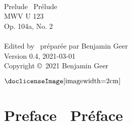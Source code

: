 \documentclass[a4paper, 12pt]{book}
\newcommand{\bigdot}[0]{{\Large \textbullet}}
\begin{document}
\frontmatter


\begin{titlepage}
\begin{center}
   \\
  \vspace{2cm}
  {\fontsize{32}{42}\selectfont Prelude \textbullet\ Prélude} \\
  \vspace{2 cm}
  {\fontsize{24}{34}\selectfont MWV U 123} \\
  \vspace{0.5 cm}
  {\fontsize{24}{34}\selectfont Op. 104a, No. 2} \\
  \vspace{4.6 cm}
  {\Large {}} \\
  \vspace{0.5 cm}
  {\Large Edited by \textbullet\ préparée par Benjamin Geer} \\
  \vspace{4.6 cm}
  {\footnotesize Version 0.4, 2021-03-01} \\
  \vspace{0.1 cm}
  {\footnotesize Copyright \copyright\ 2021 Benjamin Geer} \\
  \vspace{0.25 cm}
  \begin{minipage}{\textwidth}
  \centering
  $\vcenter{\hbox{\doclicenseImage[imagewidth=2cm]}}$
  \end{minipage}
  \end{center}
\end{titlepage}


\chapter*{Preface \bigdot\ Préface}
\end{document}
